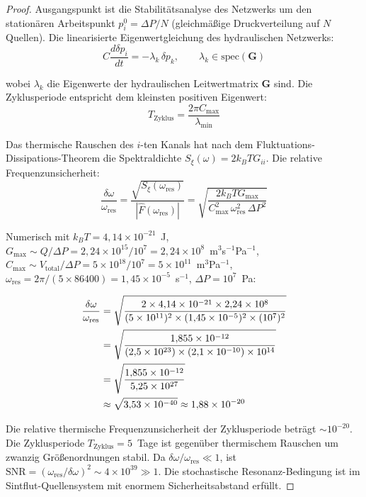 ﻿\documentclass[12pt,a4paper]{report}
\begin{document}
\begin{proof}
	Ausgangspunkt ist die Stabilitätsanalyse des Netzwerks um den stationären Arbeitspunkt $p_i^0 = \Delta P/N$ (gleichmäßige Druckverteilung auf $N$ Quellen). Die linearisierte Eigenwertgleichung des hydraulischen Netzwerks:
	\begin{equation}
		C\frac{d\delta p_i}{dt} = -\lambda_k\,\delta p_k, \qquad \lambda_k \in \mathrm{spec}(\mathbf{G})
		\label{eq:eigenwertgleichung}
	\end{equation}
	
	wobei $\lambda_k$ die Eigenwerte der hydraulischen Leitwertmatrix $\mathbf{G}$ sind. Die Zyklusperiode entspricht dem kleinsten positiven Eigenwert:
	\begin{equation}
		T_\mathrm{Zyklus} = \frac{2\pi C_\mathrm{max}}{\lambda_\mathrm{min}}
		\label{eq:zyklusperiode_eigenwert}
	\end{equation}
	
	Das thermische Rauschen des $i$-ten Kanals hat nach dem Fluktuations-Dissipations-Theorem die Spektraldichte $S_\xi(\omega) = 2k_BT G_{ii}$. Die relative Frequenzunsicherheit:
	\begin{equation}
		\frac{\delta\omega}{\omega_\mathrm{res}} = \frac{\sqrt{S_\xi(\omega_\mathrm{res})}}{|\hat{F}(\omega_\mathrm{res})|}
		= \sqrt{\frac{2k_BT G_\mathrm{max}}{C_\mathrm{max}^2\,\omega_\mathrm{res}^2\,\Delta P^2}}
		\label{eq:frequenzunsicherheit}
	\end{equation}
	
	Numerisch mit $k_BT = 4{,}14\times10^{-21}$~J, $G_\mathrm{max} \sim Q/\Delta P = 2{,}24\times10^{15}/10^7 = 2{,}24\times10^8$~m$^3$s$^{-1}$Pa$^{-1}$, $C_\mathrm{max} \sim V_\mathrm{total}/\Delta P = 5\times10^{18}/10^7 = 5\times10^{11}$~m$^3$Pa$^{-1}$, $\omega_\mathrm{res} = 2\pi/(5\times86400) = 1{,}45\times10^{-5}$~s$^{-1}$, $\Delta P = 10^7$~Pa:
	
	\begin{align}
		\frac{\delta\omega}{\omega_\mathrm{res}} &= \sqrt{\frac{2\times4{,}14\times10^{-21}\times2{,}24\times10^8}{(5\times10^{11})^2\times(1{,}45\times10^{-5})^2\times(10^7)^2}} \notag\\
		&= \sqrt{\frac{1{,}855\times10^{-12}}{(2{,}5\times10^{23})\times(2{,}1\times10^{-10})\times10^{14}}} \notag\\
		&= \sqrt{\frac{1{,}855\times10^{-12}}{5{,}25\times10^{27}}} \notag\\
		&\approx \sqrt{3{,}53\times10^{-40}} \approx 1{,}88\times10^{-20}
		\label{eq:frequenzunsicherheit_numerisch}
	\end{align}
	
	Die relative thermische Frequenzunsicherheit der Zyklusperiode beträgt $\sim 10^{-20}$. Die Zyklusperiode $T_\mathrm{Zyklus} = 5$~Tage ist gegenüber thermischem Rauschen um zwanzig Größenordnungen stabil. Da $\delta\omega/\omega_\mathrm{res} \ll 1$, ist $\mathrm{SNR} = (\omega_\mathrm{res}/\delta\omega)^2 \sim 4\times10^{39} \gg 1$. Die stochastische Resonanz-Bedingung ist im Sintflut-Quellensystem mit enormem Sicherheitsabstand erfüllt.
\end{proof}
\end{document}
